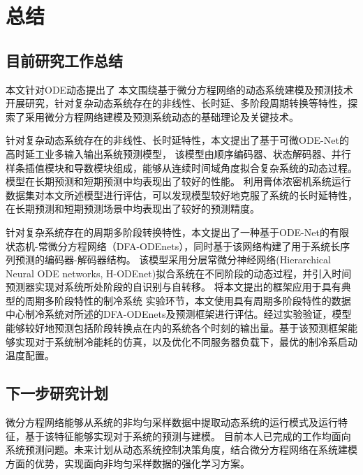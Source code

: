 \chapter{总结}
\section{目前研究工作总结}
本文针对ODE动态提出了
本文围绕基于微分方程网络的动态系统建模及预测技术开展研究，针对复杂动态系统存在的非线性、长时延、多阶段周期转换等特性，探索了采用微分方程网络建模及预测系统动态的基础理论及关键技术。

针对复杂动态系统存在的非线性、长时延特性，本文提出了基于可微ODE-Net的高时延工业多输入输出系统预测模型，
该模型由顺序编码器、状态解码器、并行样条插值模块和导数模块组成，能够从连续时间域角度拟合复杂系统的动态过程。模型在长期预测和短期预测中均表现出了较好的性能。
利用膏体浓密机系统运行数据集对本文所述模型进行评估，可以发现模型较好地克服了系统的长时延特性，在长期预测和短期预测场景中均表现出了较好的预测精度。

针对复杂系统存在的周期多阶段转换特性，本文提出了一种基于ODE-Net的有限状态机-常微分方程网络（DFA-ODEnets），同时基于该网络构建了用于系统长序列预测的编码器-解码器结构。
该模型采用分层常微分神经网络(Hierarchical Neural ODE networks, H-ODEnet)拟合系统在不同阶段的动态过程，并引入时间预测器实现对系统所处阶段的自识别与自转移。
将本文提出的框架应用于具有典型的周期多阶段特性的制冷系统
实验环节，本文使用具有周期多阶段特性的数据中心制冷系统对所述的DFA-ODEnets及预测框架进行评估。经过实验验证，模型能够较好地预测包括阶段转换点在内的系统各个时刻的输出量。基于该预测框架能够实现对于系统制冷能耗的仿真，以及优化不同服务器负载下，最优的制冷系启动温度配置。

\section{下一步研究计划}
微分方程网络能够从系统的非均匀采样数据中提取动态系统的运行模式及运行特征，基于该特征能够实现对于系统的预测与建模。
目前本人已完成的工作均面向系统预测问题。未来计划从动态系统控制决策角度，结合微分方程网络在系统建模方面的优势，实现面向非均匀采样数据的强化学习方案。

